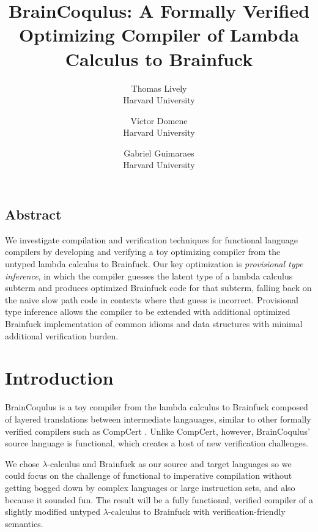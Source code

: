 \documentclass[letterpaper,twocolumn,11pt]{article}
\begin{document}
\date{}

\title{\Large \bf BrainCoqulus: A Formally Verified Optimizing Compiler of Lambda Calculus to Brainfuck}

\author{
{\rm Thomas Lively}\\
Harvard University
\and
{\rm Víctor Domene}\\
Harvard University
\and
{\rm Gabriel Guimaraes}\\
Harvard University
}


\maketitle

\thispagestyle{empty}


\subsection*{Abstract}
We investigate compilation and verification techniques for functional language compilers by developing and verifying a toy optimizing compiler from the untyped lambda calculus to Brainfuck. Our key optimization is \emph{provisional type inference}, in which the compiler guesses the latent type of a lambda calculus subterm and produces optimized Brainfuck code for that subterm, falling back on the naive slow path code in contexts where that guess is incorrect. Provisional type inference allows the compiler to be extended with additional optimized Brainfuck implementation of common idioms and data structures with minimal additional verification burden.

\section{Introduction}
BrainCoqulus is a toy compiler from the lambda calculus to Brainfuck composed of layered translations between intermediate langauages, similar to other formally verified compilers such as CompCert \cite{CompCert}. Unlike CompCert, however, BrainCoqulus' source language is functional, which creates a host of new verification challenges.

We chose $\lambda$-calculus and Brainfuck as our source and target languages so we could focus on the challenge of functional to imperative compilation without getting bogged down by complex languages or large instruction sets, and also because it sounded fun. The result will be a fully functional, verified compiler of a slightly modified untyped $\lambda$-calculus to Brainfuck with verification-friendly semantics.
\end{document}
